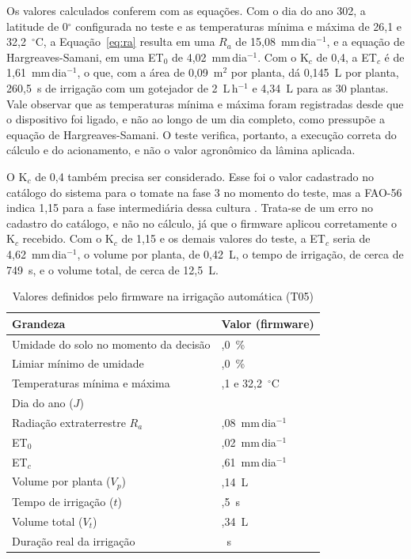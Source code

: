 Os valores calculados conferem com as equações. Com o dia do ano 302, a latitude de 0$^{\circ}$ configurada no teste e as temperaturas mínima e máxima de 26,1 e 32,2~$^{\circ}$C, a Equação~\ref{eq:ra} resulta em uma $R_a$ de 15,08~mm\,dia$^{-1}$, e a equação de Hargreaves-Samani, em uma ET$_0$ de 4,02~mm\,dia$^{-1}$. Com o K$_c$ de 0,4, a ET$_c$ é de 1,61~mm\,dia$^{-1}$, o que, com a área de 0,09~m$^2$ por planta, dá 0,145~L por planta, 260,5~s de irrigação com um gotejador de 2~L\,h$^{-1}$ e 4,34~L para as 30 plantas. Vale observar que as temperaturas mínima e máxima foram registradas desde que o dispositivo foi ligado, e não ao longo de um dia completo, como pressupõe a equação de Hargreaves-Samani. O teste verifica, portanto, a execução correta do cálculo e do acionamento, e não o valor agronômico da lâmina aplicada.

O K$_c$ de 0,4 também precisa ser considerado. Esse foi o valor cadastrado no catálogo do sistema para o tomate na fase 3 no momento do teste, mas a FAO-56 indica 1,15 para a fase intermediária dessa cultura \cite{allen1998}. Trata-se de um erro no cadastro do catálogo, e não no cálculo, já que o firmware aplicou corretamente o K$_c$ recebido. Com o K$_c$ de 1,15 e os demais valores do teste, a ET$_c$ seria de 4,62~mm\,dia$^{-1}$, o volume por planta, de 0,42~L, o tempo de irrigação, de cerca de 749~s, e o volume total, de cerca de 12,5~L.

\begin{table}[htbp]
  \centering
  \caption{Valores definidos pelo firmware na irrigação automática (T05)}
  \label{tab:t05}
  \small
  \renewcommand{\arraystretch}{1.2}
  \begin{tabularx}{\textwidth}{>{\raggedright\arraybackslash}X
                               >{\centering\arraybackslash}p{3.6cm}}
    \hline
    \textbf{Grandeza} & \textbf{Valor (firmware)} \\
    \hline
    Umidade do solo no momento da decisão & 0,0~\% \\
    Limiar mínimo de umidade & 45,0~\% \\
    Temperaturas mínima e máxima & 26,1 e 32,2~$^{\circ}$C \\
    Dia do ano ($J$) & 302 \\
    Radiação extraterrestre $R_a$ & 15,08~mm\,dia$^{-1}$ \\
    ET$_0$ & 4,02~mm\,dia$^{-1}$ \\
    ET$_c$ & 1,61~mm\,dia$^{-1}$ \\
    Volume por planta ($V_p$) & 0,14~L \\
    Tempo de irrigação ($t$) & 260,5~s \\
    Volume total ($V_t$) & 4,34~L \\
    Duração real da irrigação & 260~s \\
    \hline
  \end{tabularx}
\end{table}

